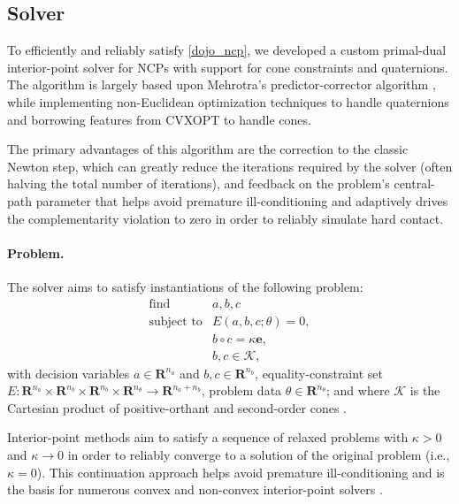 \subsection{Solver} 

To efficiently and reliably satisfy \eqref{dojo_ncp}, we developed a custom primal-dual interior-point solver for NCPs with support for cone constraints and quaternions. The algorithm is largely based upon Mehrotra's predictor-corrector algorithm \cite{mehrotra1992implementation, nocedal2006numerical}, while implementing non-Euclidean optimization techniques to handle quaternions \cite{jackson2021planning} and borrowing features from CVXOPT \cite{vandenberghe2010cvxopt} to handle cones. 

The primary advantages of this algorithm are the correction to the classic Newton step, which can greatly reduce the iterations required by the solver (often halving the total number of iterations), and feedback on the problem's central-path parameter that helps avoid premature ill-conditioning and adaptively drives the complementarity violation to zero in order to reliably simulate hard contact.

\paragraph{Problem.}
The solver aims to satisfy instantiations of the following problem:
\begin{equation}
	\begin{array}{ll}
		\underset{}{\mbox{find}} & a, b, c \\
		\mbox{subject to} & E(a, b, c; \theta) = 0, \\
		& b \circ c = \kappa \mathbf{e}, \\
		& b, c \in \mathcal{K},
	\end{array} \label{dojo_ncp_abstract}
\end{equation}
with decision variables $a \in \mathbf{R}^{n_{a}}$ and $b, c \in \mathbf{R}^{n_{b}}$, equality-constraint set $E : \mathbf{R}^{n_{a}} \times \mathbf{R}^{n_{b}} \times \mathbf{R}^{n_{b}} \times \mathbf{R}^{n_{\theta}} \rightarrow \mathbf{R}^{n_a + n_{b}}$, problem data $\theta \in \mathbf{R}^{n_{\theta}}$; and where $\mathcal{K}$ is the Cartesian product of positive-orthant and second-order cones \cite{boyd2004convex}. 

Interior-point methods aim to satisfy a sequence of relaxed problems with $\kappa > 0$ and $\kappa \rightarrow 0$ in order to reliably converge to a solution of the original problem (i.e., $\kappa = 0$). This continuation approach helps avoid premature ill-conditioning and is the basis for numerous convex and non-convex interior-point solvers \cite{nocedal2006numerical}.

